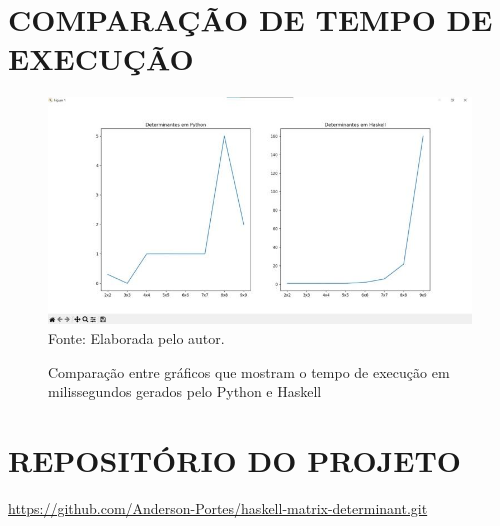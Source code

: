 \documentclass[a4paper, 12pt]{article}
\begin{document}
\section{COMPARAÇÃO DE TEMPO DE EXECUÇÃO}
 \begin{figure}[!ht]
        \centering
        \caption{Comparação entre gráficos que mostram o tempo de execução em milissegundos gerados pelo Python e Haskell}
        \includegraphics[scale=0.5]{comparacao_graficos.jpeg} \\
        {\footnotesize Fonte: Elaborada pelo autor.}
        \label{fig:my_label}
    \end{figure}

\section{REPOSITÓRIO DO PROJETO}
    \url{https://github.com/Anderson-Portes/haskell-matrix-determinant.git}
\end{document}
